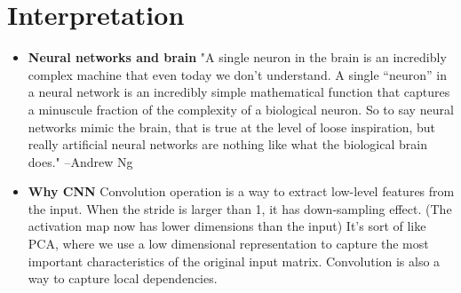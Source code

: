 \section{Interpretation}
\begin{itemize}
    \item \textbf{Neural networks and brain}  "A single neuron in the brain is an incredibly complex machine that even today we don’t understand. A single “neuron” in a neural network is an incredibly simple mathematical function that captures a minuscule fraction of the complexity of a biological neuron. So to say neural networks mimic the brain, that is true at the level of loose inspiration, but really artificial neural networks are nothing like what the biological brain does." --Andrew Ng
    \item \textbf{Why CNN} Convolution operation is a way to extract low-level features from the input. When the stride is larger than 1, it has down-sampling effect. (The activation map now has lower dimensions than the input) It's sort of like PCA, where we use a low dimensional representation to capture the most important characteristics of the original input matrix. Convolution is also a way to capture local dependencies. 
\end{itemize}



